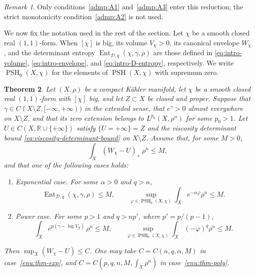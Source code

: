 \documentclass[oneside,english,letterpaper]{amsart}
\numberwithin{equation}{section}
\theoremstyle{plain}
\newtheorem{thm}{Theorem}[section]
\theoremstyle{definition}
\theoremstyle{remark}
\newtheorem{rem}[thm]{Remark}
\begin{document}
\begin{rem}
	Only conditions~\ref{admp:A1} and~\ref{admp:A3} enter this
	reduction; the strict monotonicity condition~\ref{admp:A2} is
	not used.
\end{rem}

We now fix the notation used in the rest of the section. Let
$\chi$ be a smooth closed real $(1,1)$-form. When $[\chi]$ is big,
its volume $V_\chi>0$, its canonical envelope $W_\chi$, and the
determinant entropy $\operatorname{Ent}_{\mathcal D,q}(\chi,\gamma,\rho)$
are those defined in \eqref{eq:intro-volume},
\eqref{eq:intro-envelope}, and \eqref{eq:intro-D-entropy},
respectively. We write $\operatorname{PSH}_0(X,\chi)$ for the
elements of $\operatorname{PSH}(X,\chi)$ with supremum zero.

\begin{thm}
	\label{thm:determinant-relative-Linfty}
	Let $(X, \rho)$ be a compact K\"{a}hler manifold, let
	$\chi$ be a smooth closed real $(1,1)$-form with $[\chi]$ big,
	and let $Z\subset X$ be closed and proper. Suppose that
	$\gamma\in C(X\setminus Z,[-\infty,+\infty))$ in the extended sense,
	that $e^\gamma>0$ almost everywhere on $X\setminus Z$, and that
	its zero extension belongs to $L^{p_0}(X,\rho^n)$ for some $p_0>1$.
	Let $U\in C(X,\mathbb R\cup\{+\infty\})$ satisfy
	$\{U=+\infty\}=Z$ and the viscosity determinant bound
	\eqref{eq:viscosity-determinant-bound} on $X\setminus Z$.
	Assume that, for some $M>0$,
	\begin{equation}
		\label{eq:thm-L1-hypothesis}
		\int_X(W_\chi-U)_+\,\rho^n\leq M,
	\end{equation}
	and that one of the following cases holds:
	\begin{enumerate}[label=\textnormal{(\alph*)}]
		\item\label{enu:thm-exp}
		\emph{Exponential case.} For some $\alpha>0$ and $q>n$,
		\[
		\operatorname{Ent}_{\mathcal D,q}(\chi,\gamma,\rho)\leq M,
		\qquad
		\sup_{\varphi\in\operatorname{PSH}_0(X,\chi)}
		\int_Xe^{-\alpha\varphi}\rho^n\leq M.
		\]
		\item\label{enu:thm-poly}
		\emph{Power case.} For some $p>1$ and $q>np'$, where $p'=p/(p-1)$,
		\[
		\int_X e^{p(\gamma-\log V_\chi)}\,\rho^n\leq M,
		\qquad
		\sup_{\varphi\in\operatorname{PSH}_0(X,\chi)}
		\int_X(-\varphi)^q\rho^n\leq M.
		\]
	\end{enumerate}
	Then $\sup_X(W_\chi-U)\leq C$. One may take
	$C=C(n,q,\alpha,M)$ in case~\ref{enu:thm-exp}, and
	$C=C(p,q,n,M,\int_X \rho^n)$ in case~\ref{enu:thm-poly}.
\end{thm}
\end{document}
